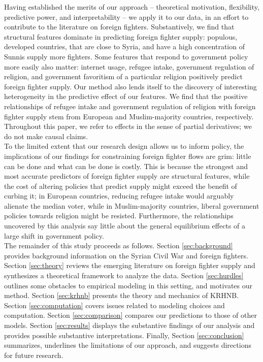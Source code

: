 \documentclass[12pt]{article}
\begin{document}
Having established the merits of our approach -- theoretical motivation, flexibility, predictive power, and interpretability -- we apply it to our data, in an effort to contribute to the literature on foreign fighters. Substantively, we find that structural features dominate in predicting foreign fighter supply: populous, developed countries, that are close to Syria, and have a high concentration of Sunnis supply more fighters. Some features that respond to government policy more easily also matter: internet usage, refugee intake, government regulation of religion, and government favoritism of a particular religion positively predict foreign fighter supply. Our method also lends itself to the discovery of interesting heterogeneity in the predictive effect of our features. We find that the positive relationships of refugee intake and government regulation of religion with foreign fighter supply stem from European and Muslim-majority countries, respectively. Throughout this paper, we refer to effects in the sense of partial derivatives; we do not make causal claims.	\\

To the limited extent that our research design allows us to inform policy, the implications of our findings for constraining foreign fighter flows are grim: little can be done and what can be done is costly. This is because the strongest and most accurate predictors of foreign fighter supply are structural features, while the cost of altering policies that predict supply might exceed the benefit of curbing it; in European countries, reducing refugee intake would arguably alienate the median voter, while in Muslim-majority countries, liberal government policies towards religion might be resisted. Furthermore, the relationships uncovered by this analysis say little about the general equilibrium effects of a large shift in government policy.    \\

The remainder of this study proceeds as follows. Section \ref{sec:background} provides background information on the Syrian Civil War and foreign fighters. Section \ref{sec:theory} reviews the emerging literature on foreign fighter supply and synthesizes a theoretical framework to analyze the data. Section \ref{sec:hurdles} outlines some obstacles to empirical modeling in this setting, and motivates our method. Section \ref{sec:krhnb} presents the theory and mechanics of KRHNB. Section \ref{sec:computation} covers issues related to modeling choices and computation. Section \ref{sec:comparison} compares our predictions to those of other models. Section \ref{sec:results} displays the substantive findings of our analysis and provides possible substantive interpretations. Finally, Section \ref{sec:conclusion} summarizes, underlines the limitations of our approach, and suggests directions for future research. 
\end{document}
